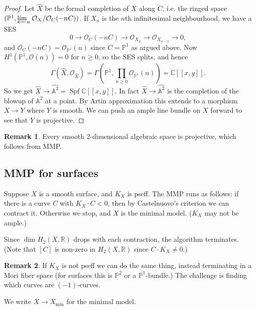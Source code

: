 \documentclass{article}
\theoremstyle{definition}
\newtheorem*{remark}{Remark}
\DeclareMathOperator{\Spf}{Spf}
\newcommand{\series}[2]{#1[\![#2]\!]}
\newcommand{\minm}{\mathrm{min}}
\renewcommand{\O}{\mathcal{O}}
\newcommand{\A}{\mathbb{A}}
\renewcommand{\P}{\mathbb{P}}
\newcommand{\R}{\mathbb{R}}
\newcommand{\C}{\mathbb{C}}
\begin{document}
\begin{proof}
    Let $\widehat X$ be the formal completion of $X$ along $C$, i.e. the ringed
    space $(\P^1,\varprojlim_n\O_X/\O_C(-nC))$. If $X_n$ is the $n$th
    infinitesimal neighbourhood, we have a SES
    \begin{equation*}
        0 \to \O_C(-nC) \to \O_{X_n} \to \O_{X_{n-1}} \to 0,
    \end{equation*}
    and $\O_C(-nC)=\O_{\P^1}(n)$ since $C=\P^1$ as argued above. Now
    $H^1(\P^1,\O(n))=0$ for $n\ge0$, so the SES splits, and hence
    \begin{equation*}
        \Gamma(\widehat X,\O_{\widehat X})
            = \Gamma(\P^1,\prod_{n\ge0}\O_{\P^1}(n))
            = \series{\C}{x,y}.
    \end{equation*}
    So we get $\widehat X\to\widehat{\A^2}=\Spf\series{\C}{x,y}$. In fact
    $\widehat X\to\widehat{\A^2}$ is the completion of the blowup of $\A^2$ at a
    point. By Artin approximation this extends to a morphism $X\to Y$ where $Y$
    is smooth. We can push an ample line bundle on $X$ forward to see that $Y$
    is projective.
\end{proof}

\begin{remark}
    Every smooth 2-dimensional algebraic space is projective, which follows from
    MMP.
\end{remark}

\subsection*{MMP for surfaces}

Suppose $X$ is a smooth surface, and $K_X$ is pseff. The MMP runs as follows: if
there is a curve $C$ with $K_X\cdot C<0$, then by Castelnuovo's criterion we can
contract it. Otherwise we stop, and $X$ is the minimal model. ($K_X$ may not be
ample.)

Since $\dim H_2(X,\R)$ drops with each contraction, the algorithm terminates.
(Note that $[C]$ is non-zero in $H_2(X,\R)$ since $C\cdot K_X\ne0$.)

\begin{remark}
    If $K_X$ is not pseff we can do the same thing, instead terminating in a Mori
    fiber space (for surfaces this is $\P^2$ or a $\P^1$-bundle.) The
    challenge is finding which curves are $(-1)$-curves.
\end{remark}

We write $X\to X_\minm$ for the minimal model.
\end{document}
